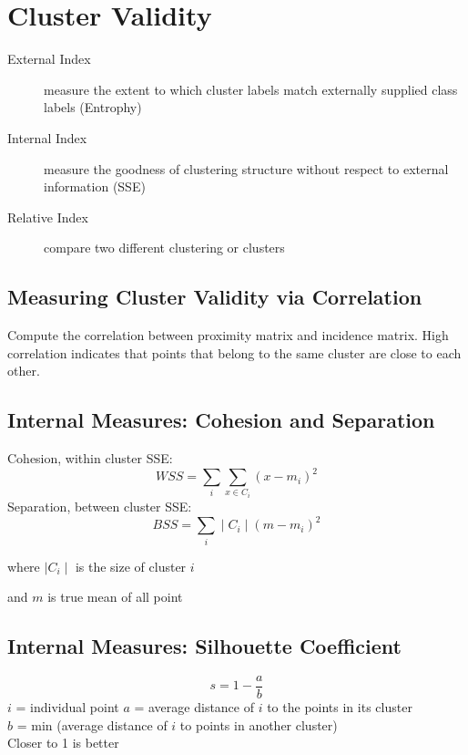 \section{Cluster Validity}

\begin{description}
\item[External Index] measure the extent to which cluster labels match externally supplied class labels (Entrophy)
\item[Internal Index] measure the goodness of clustering structure without respect to external information (SSE)
\item[Relative Index] compare two different clustering or clusters
\end{description}

\subsection{Measuring Cluster Validity via Correlation}
Compute the correlation between proximity matrix and incidence matrix. High correlation indicates that points that belong to the same cluster are close to each other.

\subsection{Internal Measures: Cohesion and Separation}
Cohesion, within cluster SSE:
$$WSS=\sum_{i} \sum_{x \in C_i} (x-m_i)^{2}$$
Separation, between cluster SSE:
$$BSS=\sum_{i} \mid C_i \mid (m-m_{i})^{2}$$
\begin{center}where $\mid C_i \mid$ is the size of cluster $i$\end{center}
\begin{center}and $m$ is true mean of all point\end{center}
\subsection{Internal Measures: Silhouette Coefficient}
$$s=1-\frac{a}{b}$$
$i$ = individual point
$a$ = average distance of $i$ to the points in its cluster\\
$b$ = min (average distance of $i$ to points in another cluster)\\
Closer to 1 is better
